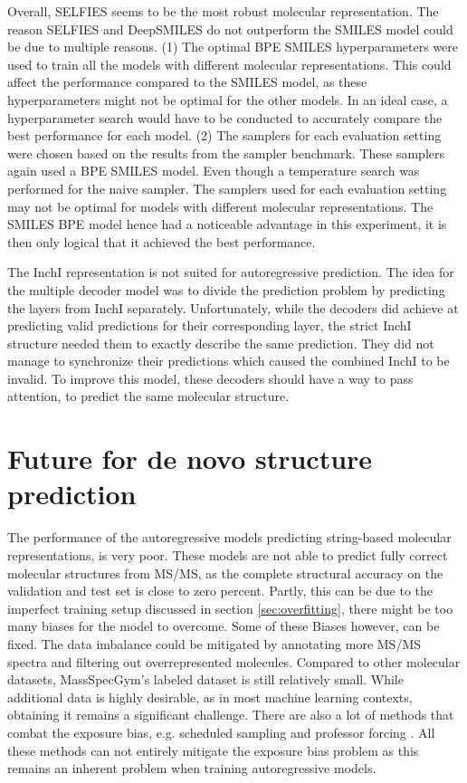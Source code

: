 Overall, SELFIES seems to be the most robust molecular representation.
The reason SELFIES and DeepSMILES do not outperform the SMILES model could be due to multiple reasons.
(1) The optimal \ac{BPE} SMILES hyperparameters were used to train all the models with different molecular representations.
This could affect the performance compared to the SMILES model, as these hyperparameters might not be optimal for the other models.
In an ideal case, a hyperparameter search would have to be conducted to accurately compare the best performance for each model.
(2) The samplers for each evaluation setting were chosen based on the results from the sampler benchmark.
These samplers again used a \ac{BPE} SMILES model. Even though a temperature search was performed for the naive sampler.
The samplers used for each evaluation setting may not be optimal for models with different molecular representations.
The SMILES \ac{BPE} model hence had a noticeable advantage in this experiment, it is then only logical that it achieved the best performance.

The InchI representation is not suited for autoregressive prediction.
The idea for the multiple decoder model was to divide the prediction problem by predicting the layers from InchI separately.
Unfortunately, while the decoders did achieve at predicting valid predictions for their corresponding layer, the strict InchI structure needed them to exactly describe the same prediction.
They did not manage to synchronize their predictions which caused the combined InchI to be invalid.
To improve this model, these decoders should have a way to pass attention, to predict the same molecular structure.

\section{Future for de novo structure prediction}

The performance of the autoregressive models predicting string-based molecular representations, is very poor.
These models are not able to predict fully correct molecular structures from \ac{MS/MS}, as the complete structural accuracy on the validation and test set is close to zero percent.
Partly, this can be due to the imperfect training setup discussed in section \ref{sec:overfitting}, there might be too many biases for the model to overcome.
Some of these Biases however, can be fixed.
The data imbalance could be mitigated by annotating more \ac{MS/MS} spectra and filtering out overrepresented molecules.
Compared to other molecular datasets, MassSpecGym's labeled dataset is still relatively small.
While additional data is highly desirable, as in most machine learning contexts, obtaining it remains a significant challenge.
There are also a lot of methods that combat the exposure bias, e.g. scheduled sampling \cite{bengio2015scheduled} and professor forcing \cite{lamb2016professor}.
All these methods can not entirely mitigate the exposure bias problem as this remains an inherent problem when training autoregressive models.

